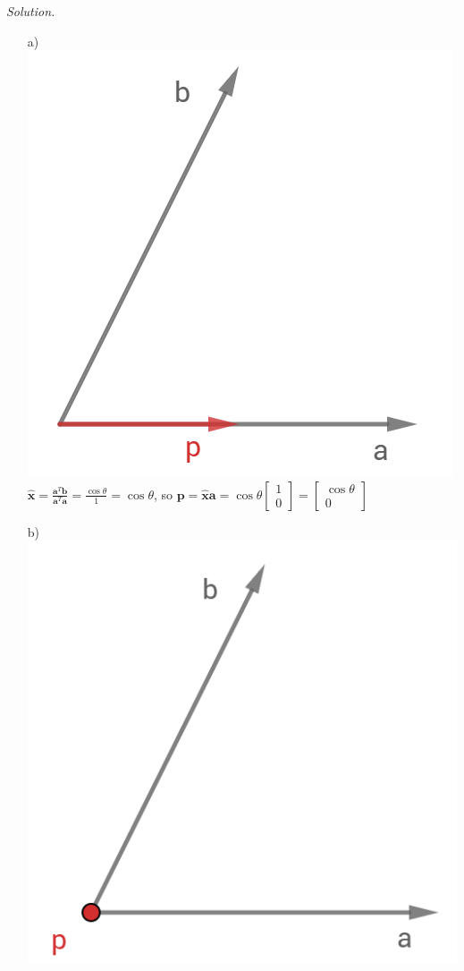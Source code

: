 \documentclass[12pt]{article}
\begin{document}
\begin{itemize}
\textit{Solution.}
\begin{itemize}
\item[a)] \includegraphics[scale=0.5]{a.PNG} \\
		  $\hat{\mathbf{x}}=\frac{\mathbf{a}^T\mathbf{b}}{\mathbf{a}^T\mathbf{a}}=\frac{\cos\theta}{1}=\cos\theta$, so 
	      $\mathbf{p}=\hat{\mathbf{x}}\mathbf{a}=\cos\theta\left[\begin{array}{c} 1 \\ 0 \end{array}\right]=
          \left[\begin{array}{c} \cos\theta \\ 0 \end{array}\right]$
\item[b)] \includegraphics[scale=0.5]{b.PNG} \\

\end{itemize}
\end{itemize}
\end{document}

